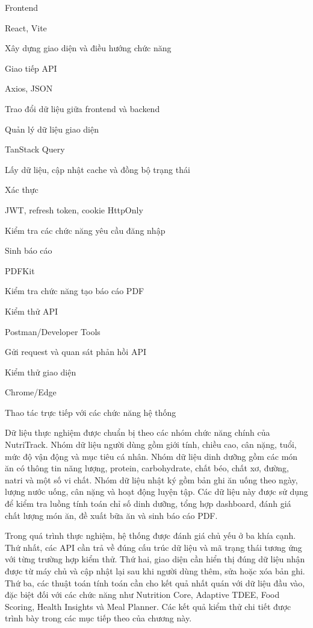 \documentclass[12pt, a4paper]{report}
\begin{document}
Frontend

React, Vite

Xây dựng giao diện và điều hướng chức năng

Giao tiếp API

Axios, JSON

Trao đổi dữ liệu giữa frontend và backend

Quản lý dữ liệu giao diện

TanStack Query

Lấy dữ liệu, cập nhật cache và đồng bộ trạng thái

Xác thực

JWT, refresh token, cookie HttpOnly

Kiểm tra các chức năng yêu cầu đăng nhập

Sinh báo cáo

PDFKit

Kiểm tra chức năng tạo báo cáo PDF

Kiểm thử API

Postman/Developer Tools

Gửi request và quan sát phản hồi API

Kiểm thử giao diện

Chrome/Edge

Thao tác trực tiếp với các chức năng hệ thống

Dữ liệu thực nghiệm được chuẩn bị theo các nhóm chức năng chính của NutriTrack. Nhóm dữ liệu người dùng gồm giới tính, chiều cao, cân nặng, tuổi, mức độ vận động và mục tiêu cá nhân. Nhóm dữ liệu dinh dưỡng gồm các món ăn có thông tin năng lượng, protein, carbohydrate, chất béo, chất xơ, đường, natri và một số vi chất. Nhóm dữ liệu nhật ký gồm bản ghi ăn uống theo ngày, lượng nước uống, cân nặng và hoạt động luyện tập. Các dữ liệu này được sử dụng để kiểm tra luồng tính toán chỉ số dinh dưỡng, tổng hợp dashboard, đánh giá chất lượng món ăn, đề xuất bữa ăn và sinh báo cáo PDF.

Trong quá trình thực nghiệm, hệ thống được đánh giá chủ yếu ở ba khía cạnh. Thứ nhất, các API cần trả về đúng cấu trúc dữ liệu và mã trạng thái tương ứng với từng trường hợp kiểm thử. Thứ hai, giao diện cần hiển thị đúng dữ liệu nhận được từ máy chủ và cập nhật lại sau khi người dùng thêm, sửa hoặc xóa bản ghi. Thứ ba, các thuật toán tính toán cần cho kết quả nhất quán với dữ liệu đầu vào, đặc biệt đối với các chức năng như Nutrition Core, Adaptive TDEE, Food Scoring, Health Insights và Meal Planner. Các kết quả kiểm thử chi tiết được trình bày trong các mục tiếp theo của chương này.
\end{document}
